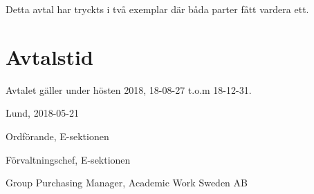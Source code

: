 \documentclass[10pt]{article}
\def\date{2018-05-21} %
\begin{document}
        Detta avtal har tryckts i två exemplar där båda parter fått vardera ett.
        
        \section{Avtalstid}
        Avtalet gäller under hösten 2018, 18-08-27 t.o.m 18-12-31.

        \begin{signatures}{3}
            Lund, \date
            \signature{Daniel Bakic}{Ordförande, E-sektionen}
            \signature{Magnus Lundh}{Förvaltningschef, E-sektionen}
            \signature{Niklas Dennerholt}{Group Purchasing Manager, Academic Work Sweden AB}
        \end{signatures}
    
\end{document}

